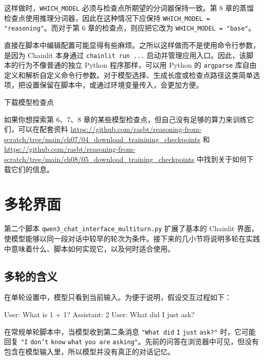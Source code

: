 这样做时，\texttt{WHICH\_MODEL} 必须与检查点所期望的分词器保持一致。第 8 章的蒸馏检查点使用推理分词器，因此在这种情况下应保持 \texttt{WHICH\_MODEL = }\texttt{"}\texttt{reasoning}\texttt{"}。而对于第 6 章的检查点，则应把它改为 \texttt{WHICH\_MODEL = }\texttt{"}\texttt{base}\texttt{"}。

直接在脚本中编辑配置可能显得有些麻烦。之所以这样做而不是使用命令行参数，是因为 Chainlit 本身通过 \texttt{chainlit run ...} 启动并管理应用入口。因此，该脚本的行为不像普通的独立 Python 程序那样，可以用 Python 的 \texttt{argparse} 库自由定义和解析自定义命令行参数。对于模型选择、生成长度或检查点路径这类简单选项，把设置保留在脚本中，或通过环境变量传入，会更加方便。

\begin{mySidebar}{下载模型检查点}

如果你想探索第 6、7、8 章的某些模型检查点，但自己没有足够的算力来训练它们，可以在配套资料 \href{https://github.com/rasbt/reasoning-from-scratch/tree/main/ch07/04\_download\_trainining\_checkpoints}{https://github.com/rasbt/reasoning-from-scratch/tree/main/ch07/04\_download\_trainining\_checkpoints} 和 \href{https://github.com/rasbt/reasoning-from-scratch/tree/main/ch08/05\_download\_training\_checkpoints}{https://github.com/rasbt/reasoning-from-scratch/tree/main/ch08/05\_download\_training\_checkpoints} 中找到关于如何下载它们的信息。

\end{mySidebar}

\section{多轮界面}

第二个脚本 \texttt{qwen3\_chat\_interface\_multiturn.py} 扩展了基本的 Chainlit 界面，使模型能够以同一段对话中较早的轮次为条件。接下来的几小节将说明多轮在实践中意味着什么、脚本如何实现它，以及何时适合使用。

\subsection{多轮的含义}

在单轮设置中，模型只看到当前输入。为便于说明，假设交互过程如下：

\begin{codebox}
User: What is 1 + 1?
Assistant: 2
User: What did I just ask?
\end{codebox}

在常规单轮脚本中，当模型收到第二条消息 \texttt{"}\texttt{What did} \texttt{I} \texttt{just} \texttt{ask?}\texttt{"} 时，它可能回复 \texttt{"}\texttt{I} \texttt{don}\texttt{'}\texttt{t} \texttt{know} \texttt{what} \texttt{you are} \texttt{asking}\texttt{"}。先前的问答在浏览器中可见，但没有包含在模型输入里，所以模型并没有真正的对话记忆。


